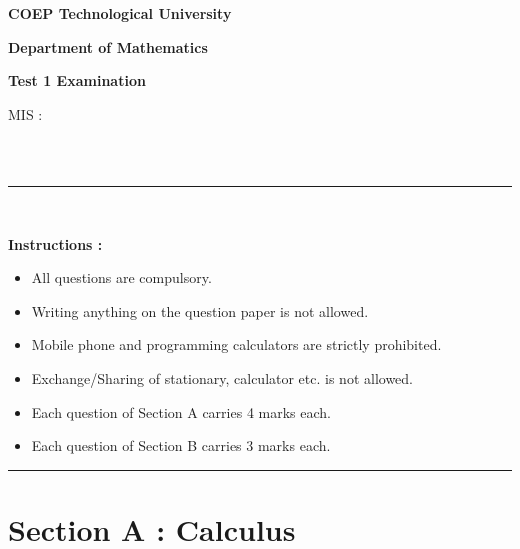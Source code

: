 \documentclass[12pt , a4paper]{article}
\begin{document}
\pagebreak

\begin{center}

\Large \textbf {COEP Technological University}
\vspace{0.5cm}

\large \textbf {Department of Mathematics} 
\vspace{0.5cm}

\large \textbf {Test 1 Examination}\\
\end{center}
\noindent MIS : 
\begin{tabular}{|c|c|c|c|c|c|c|c|c|}
\hline
 &  &  &  &  &  &   &  &  \\ \hline
\end{tabular}\\
\rule{\textwidth}{0.1pt}\\


\begin{large}
\noindent \textbf {Instructions : }
\end{large}
\begin{itemize}
\item All questions are compulsory.
\item Writing anything on the question paper is not allowed.
\item Mobile phone and programming calculators are strictly prohibited.
\item Exchange/Sharing of stationary, calculator etc. is not allowed.
\item Each question of Section A carries 4 marks each.
\item Each question of Section B carries 3 marks each.
\end{itemize}
\rule{\textwidth}{0.1pt}
\section*{Section A : Calculus}
\end{document}

